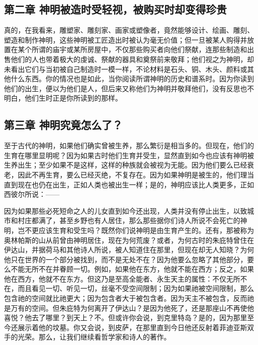 
\subsection{第二章 神明被造时受轻视，被购买时却变得珍贵}

真的，在我看来，雕塑家、雕刻家、画家或塑像者，竟然能够设计、绘画、雕刻、塑造和制作神明，这些神明被工匠造出时被认为毫无价值；但一旦被某人购得并放置在某个所谓的庙宇或某所房屋中，不仅那些购买者向他们祭献，连那些制造和出售他们的人也带着极大的虔诚、祭献的器具和奠祭前来敬拜；他们视之为神明，却未看出它们与当初被自己制造时一模一样，不论材料是石头、铜、木头、颜料或其他什么东西。你的情况也是如此，当你阅读所谓神明的历史和谱系时。因为你读到他们的出生，便以为他们是人，但后来又称他们为神明并敬拜他们，没有反思也不明白，他们生时正是你所读到的那样。\par


\subsection{第三章 神明究竟怎么了？}

至于古代的神明，如果他们确实曾被生养，那么繁衍是相当多的。但现在，他们的生育在哪里显明呢？因为如果古时他们生育并受生，显然直到如今也应该有神明被生养出生；至少如果不是这样，这样的种族就会被视为无能。因为他们要么已经衰老，因此不再生育，要么已经灭绝，不复存在。因为如果神明是被生的，他们理当直到现在也仍在出生，正如人类也被出生一样；是的，神明应该比人类更多，正如西彼尔所说：——\par

\par

因为如果那些必死短命之人的儿女直到如今还出现，人类并没有停止出生，以致城市和村庄都满了，甚至乡野也有人居住，那么那些据你们诗人所说不会死亡的神明，岂不更应该生育和受生吗？既然你们说神明是由生育产生的。还有，那被称为奥林帕斯的山从前曾由神明居住，现在为何荒废？或者，为何古时的朱庇特曾住在伊达山，并据荷马和其他诗人所说，被人知道住在那里，但现在却无人知晓？为何他只在世界的一个部分被找到，而不是无处不在？因为他要么忽略了其他部分，要么不能无所不在并眷顾一切。例如，如果他在东方，他就不能在西方；反之，如果他在西方，他就不在东方。但这乃是至高全能者、永生天主的属性：不仅无所不在，而且看见一切、听见一切，丝毫不受空间限制；因为如果祂被空间限制，那么包含祂的空间就比祂更大；因为包含者大于被包含者。因为天主不被包含，反而祂是万有的空间。但朱庇特为何离开了伊达山？是因为他死了，还是那座山不再使他喜悦？他去了哪里？到天上？不。但或许你会说，到克里特岛？是的，因为那里至今还展示着他的坟墓。你又会说，到皮萨，在那里直到今日他还反射着菲迪亚斯双手的光荣。那么，让我们继续看哲学家和诗人的著作。\par

